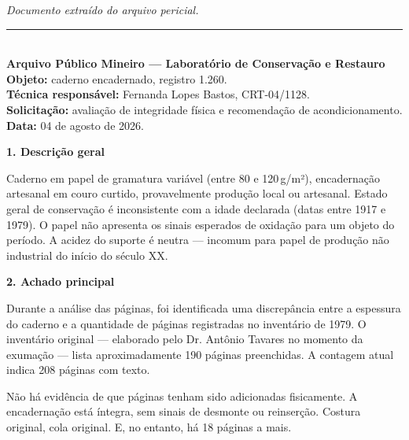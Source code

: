 
\noindent \textit{Documento extraído do arquivo pericial.}

\vspace{0.5em}\noindent\rule{\textwidth}{0.5pt}\vspace{0.5em}

\\[-0.2em]

\noindent \textbf{Arquivo Público Mineiro --- Laboratório de Conservação e Restauro}\\
\noindent \textbf{Objeto:} caderno encadernado, registro 1.260.\\
\noindent \textbf{Técnica responsável:} Fernanda Lopes Bastos, CRT-04/1128.\\
\noindent \textbf{Solicitação:} avaliação de integridade física e recomendação de acondicionamento.\\
\noindent\textbf{Data:} 04 de agosto de 2026.

\noindent \textbf{1. Descrição geral}

\noindent Caderno em papel de gramatura variável (entre 80 e 120\,g/m²), encadernação artesanal em couro curtido, provavelmente produção local ou artesanal. Estado geral de conservação é inconsistente com a idade declarada (datas entre 1917 e 1979). O papel não apresenta os sinais esperados de oxidação para um objeto do período. A acidez do suporte é neutra --- incomum para papel de produção não industrial do início do século XX.

\noindent \textbf{2. Achado principal}

\noindent Durante a análise das páginas, foi identificada uma discrepância entre a espessura do caderno e a quantidade de páginas registradas no inventário de 1979. O inventário original --- elaborado pelo Dr. Antônio Tavares no momento da exumação --- lista aproximadamente 190 páginas preenchidas. A contagem atual indica 208 páginas com texto.

\noindent Não há evidência de que páginas tenham sido adicionadas fisicamente. A encadernação está íntegra, sem sinais de desmonte ou reinserção. Costura original, cola original. E, no entanto, há 18 páginas a mais.

